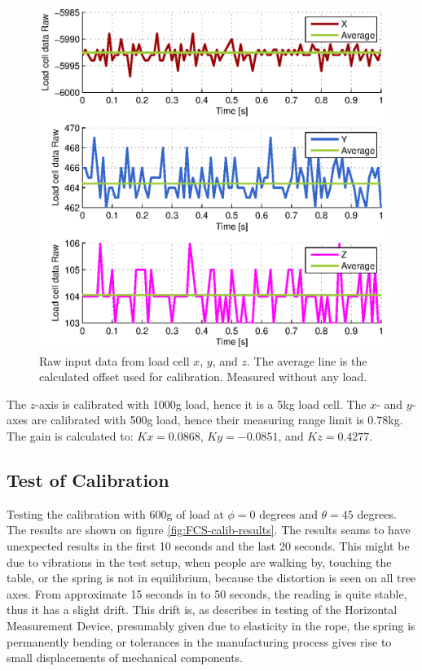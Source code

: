 \begin{figure}[hbtp]
\centering
\includegraphics[scale=1]{graphics/fcs_test/fcs_calib.eps}
\caption[Raw input data from load cell $x$, $y$, and $z$.]{Raw input data from load cell $x$, $y$, and $z$. The average line is the calculated offset used for calibration. Measured without any load.}
\label{fig:fcs-calib-offset}
\end{figure}

\noindent
The $z$-axis is calibrated with 1000g load, hence it is a 5kg load cell. The $x$- and $y$-axes are calibrated with 500g load, hence their measuring range limit is $0.78$kg. The gain is calculated to: $Kx=0.0868$, $Ky=-0.0851$, and $Kz=0.4277$. 
\\


\subsection{Test of Calibration}
Testing the calibration with 600g of load at $\phi=0$ degrees and $\theta=45$ degrees. The results are shown on figure \ref{fig:FCS-calib-results}. The results seams to have unexpected results in the first 10 seconds and the last 20 seconds. This might be due to vibrations in the test setup, when people are walking by, touching the table, or the spring is not in equilibrium, because the distortion is seen on all tree axes. From approximate 15 seconds in to 50 seconds, the reading is quite stable, thus it has a slight drift. This drift is, as describes in testing of the Horizontal Measurement Device, presumably given due to elasticity in the rope, the spring is permanently bending or tolerances in the manufacturing process gives rise to small displacements of mechanical components.\\
\\

